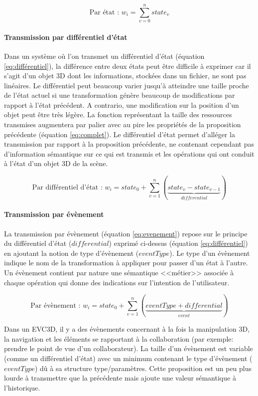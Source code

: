 \begin{equation}
\label{eq:complet}
\text{Par état : } w_i = \sum_{v=0}^{n}state_{v}
\end{equation}


\paragraph{Transmission par différentiel d'état}
\label{par:diff}
Dans un système où l'on transmet un différentiel d'état (équation 
\ref{eq:différentiel}), la différence entre deux états peut être difficile à exprimer 
 car il s'agit d'un objet 3D dont les informations, stockées dans 
un fichier, ne sont pas linéaires. Le différentiel peut beaucoup varier jusqu'à 
atteindre une taille proche de l'état actuel si une transformation génère beaucoup 
de modifications par rapport à l'état précédent. A contrario, une modification sur la 
position d'un objet peut être très légère. La fonction représentant la taille des 
ressources transmises augmentera par palier avec au pire les propriétés de la 
proposition précédente (équation \ref{eq:complet}). Le différentiel d'état permet 
d'alléger la transmission par rapport à la proposition précédente, ne contenant 
cependant pas d'information sémantique sur ce qui est transmis et les opérations 
qui ont conduit à l'état d'un objet 3D de la scène.

\begin{equation}
\label{eq:différentiel}
\text{Par différentiel d'état : } w_i = state_0 + \sum_{v=1}^{n}(\underbrace{state_{v} 
- state_{v-1}}_{differential})
\end{equation}

\paragraph{Transmission par évènement}
La transmission par évènement (équation \ref{eq:evenement}) repose sur le 
principe du différentiel d'état ($differential$) exprimé ci-dessus (équation 
\ref{eq:différentiel}) en ajoutant la notion de type d'évènement ($eventType$). Le 
type d'un évènement indique le nom de la transformation à appliquer pour passer 
d'un état à l'autre. Un évènement contient par nature une sémantique <<métier>> 
associée à chaque opération qui donne des indications sur l'intention de 
l'utilisateur. 

\begin{equation}
\label{eq:evenement}
\text{Par évènement : } w_i= state_0 + \sum_{v=1}^{n}(\underbrace{eventType + 
differential}_{event}) 
\end{equation}

Dans un \gls{EVC3D}, il y a des évènements concernant à la fois la manipulation 
3D, la navigation et les éléments se rapportant à la collaboration (par exemple: 
prendre le point de vue d'un collaborateur). La taille d'un évènement est variable 
(comme un différentiel d'état) avec un minimum contenant le type d'évènement 
($eventType$) dû à sa structure type/paramètres. Cette proposition est un peu 
plus lourde à transmettre que la précédente mais ajoute une valeur sémantique à 
l'historique.
